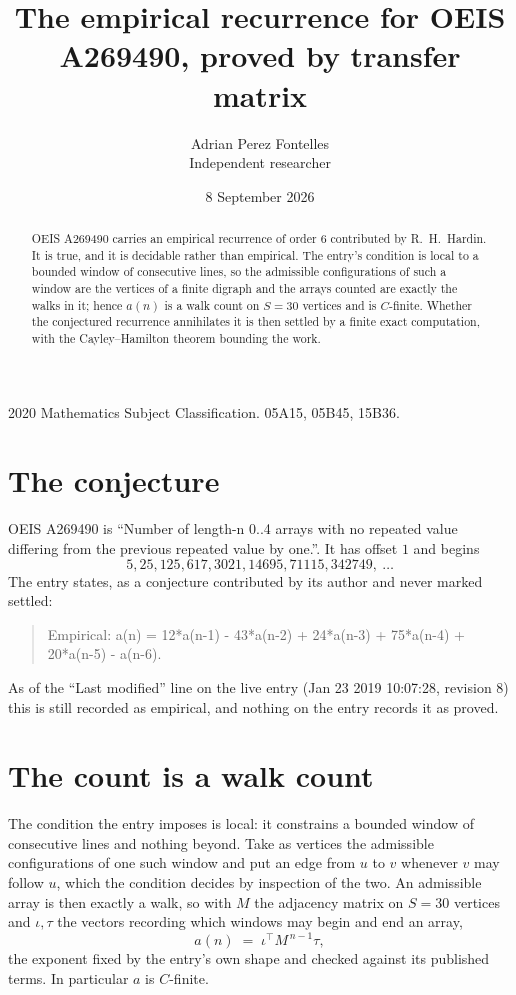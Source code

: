 \documentclass[11pt,a4paper]{article}
\title{The empirical recurrence for OEIS A269490, proved by transfer matrix}
\author{Adrian Perez Fontelles\\ \small Independent researcher}
\date{8 September 2026}
\theoremstyle{plain}
\theoremstyle{definition}
\begin{document}
\maketitle

\begin{abstract}
OEIS A269490 carries an empirical recurrence of order $6$ contributed by R.~H.~Hardin. It is
true, and it is decidable rather than empirical. The entry's condition is local to a bounded window of consecutive lines, so
the admissible configurations of such a window are the vertices of a finite digraph and the
arrays counted are exactly the walks in it; hence $a(n)$ is a walk count on $S=30$ vertices
and is $C$-finite. Whether the conjectured recurrence annihilates it is then settled by a
finite exact computation, with the Cayley--Hamilton theorem bounding the work.
\end{abstract}

\noindent\small 2020 Mathematics Subject Classification. 05A15, 05B45, 15B36.\normalsize

\section{The conjecture}

OEIS A269490 is ``Number of length-n 0..4 arrays with no repeated value differing from the previous repeated value by one.''. It has offset $1$ and begins
\[
5, 25, 125, 617, 3021, 14695, 71115, 342749,\ \dots
\]
The entry states, as a conjecture contributed by its author and never marked settled:
\begin{quote}
Empirical: a(n) = 12*a(n-1) - 43*a(n-2) + 24*a(n-3) + 75*a(n-4) + 20*a(n-5) - a(n-6).
\end{quote}
As of the ``Last modified'' line on the live entry (Jan 23 2019 10:07:28, revision 8) this is still
recorded as empirical, and nothing on the entry records it as proved.

\section{The count is a walk count}

The condition the entry imposes is local: it constrains a bounded window of consecutive lines and nothing beyond. Take as
vertices the admissible configurations of one such window and put an edge from $u$ to $v$
whenever $v$ may follow $u$, which the condition decides by inspection of the two. An
admissible array is then exactly a walk, so with $M$ the adjacency matrix on $S=30$ vertices
and $\iota,\tau$ the vectors recording which windows may begin and end an array,
\[
a(n)\;=\;\iota^{\!\top}M^{\,n-1}\tau ,
\]
the exponent fixed by the entry's own shape and checked against its published terms. In
particular $a$ is $C$-finite.
\end{document}
